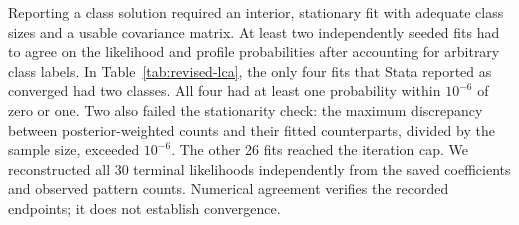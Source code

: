 Reporting a class solution required an interior, stationary fit with
adequate class sizes and a usable covariance matrix. At least two
independently seeded fits had to agree on the likelihood and profile
probabilities after accounting for arbitrary class labels. In
Table~\ref{tab:revised-lca}, the only four fits that Stata reported as
converged had two classes. All four had at least one probability within
$10^{-6}$ of zero or one. Two also failed the stationarity check: the
maximum discrepancy between posterior-weighted counts and their fitted
counterparts, divided by the sample size, exceeded $10^{-6}$. The other
26 fits reached the iteration cap. We reconstructed all 30 terminal
likelihoods independently from the saved coefficients and observed
pattern counts. Numerical agreement verifies the recorded endpoints;
it does not establish convergence.

